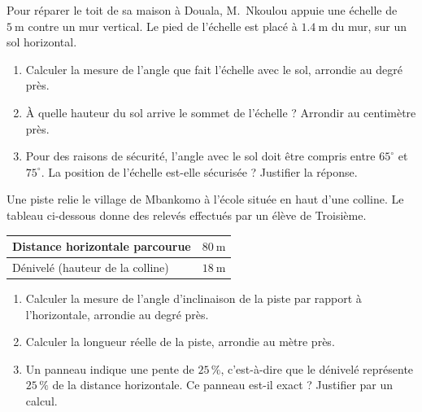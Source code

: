 \documentclass[11pt]{article}
\begin{document}
\begin{exercice}
Pour réparer le toit de sa maison à Douala, M.~Nkoulou appuie une échelle de $\SI{5}{\meter}$ contre un mur vertical. Le pied de l'échelle est placé à $\SI{1,4}{\meter}$ du mur, sur un sol horizontal.
\begin{enumerate}
\item Calculer la mesure de l'angle que fait l'échelle avec le sol, arrondie au degré près.
\item À quelle hauteur du sol arrive le sommet de l'échelle ? Arrondir au centimètre près.
\item Pour des raisons de sécurité, l'angle avec le sol doit être compris entre $65^\circ$ et $75^\circ$. La position de l'échelle est-elle sécurisée ? Justifier la réponse.
\end{enumerate}
\end{exercice}

\begin{exercice}
Une piste relie le village de Mbankomo à l'école située en haut d'une colline. Le tableau ci-dessous donne des relevés effectués par un élève de Troisième.

\begin{center}
\begin{tabular}{|l|c|}
\hline
Distance horizontale parcourue & $\SI{80}{\meter}$ \\
\hline
Dénivelé (hauteur de la colline) & $\SI{18}{\meter}$ \\
\hline
\end{tabular}
\end{center}

\begin{enumerate}
\item Calculer la mesure de l'angle d'inclinaison de la piste par rapport à l'horizontale, arrondie au degré près.
\item Calculer la longueur réelle de la piste, arrondie au mètre près.
\item Un panneau indique une pente de $25\,\%$, c'est-à-dire que le dénivelé représente $25\,\%$ de la distance horizontale. Ce panneau est-il exact ? Justifier par un calcul.
\end{enumerate}
\end{exercice}
\end{document}
